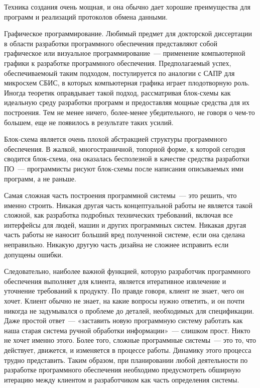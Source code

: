 Техника создания  очень мощная, и она обычно дает хорошие
преимущества для программ  и реализаций протоколов
обмена данными. 

Графическое программирование. Любимый предмет для докторской диссертации в
области разработки программного обеспечения представляют собой графическое или
визуальное программирование\ --- применение компьютерной графики к разработке
программного обеспечения. Предполагаемый успех, обеспечиваемоый таким подходом,
постулируется по аналогии с САПР для микросхем СБИС, в которых компьютерная
графика играет плодотворную роль. Иногда теоретик оправдывает такой подход,
рассматривая блок-схемы как идеальную среду разработки программ и предоставляя
мощные средства для их построения. Тем не менее ничего, более-менее
убедительного, не говоря о чем-то большем, еще не появилось в результате таких
усилий.

Блок-схема является очень плохой абстракцией структуры программного обеспечения.
В жалкой, многостраничной, топорной форме, к которой сегодня сводится
блок-схема, она оказалась бесполезной в качестве средства разработки ПО\ ---
программисты рисуют блок-схемы после написания описываемых ими программ, а не
раньше.

Самая сложная часть построения программной системы\ --- это решить, что именно
строить. Никакая другая часть концептуальной работы не является такой сложной,
как разработка подробных технических требований, включая все интерфейсы для
людей, машин и других программных систем. Никакая другая часть работы не наносит
больший вред полученной системе, если она сделана неправильно. Никакую другую
часть дизайна не сложнее исправить если допущены ошибки.

Следовательно, наиболее важной функцией, которую разработчик программного
обеспечения выполняет для клиента, является итеративное извлечение и уточнение
требований к продукту. По правде говоря, клиент не знает, чего он хочет. Клиент
обычно не знает, на какие вопросы нужно ответить, и он почти никогда не
задумывался о проблеме до деталей, необходимых для спецификации. Даже простой
ответ\ --- «заставить новую программную систему работать как наша старая система
ручной обработки информации»\ --- слишком прост. Никто не хочет именно этого.
Более того, сложные программные системы\ --- это то, что действует, движется, и
изменяется в процессе работы. Динамику этого процесса трудно представить. Таким
образом, при планировании любой деятельности по разработке программного
обеспечения необходимо предусмотреть обширную итерацию между клиентом и
разработчиком как часть определения системы.

